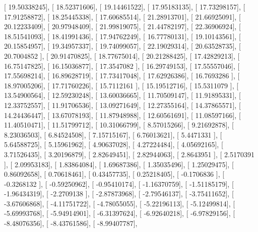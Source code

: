\documentclass{article}
\begin{document}
       [ 19.50338245],
       [ 18.52371606],
       [ 19.14461522],
       [ 17.95183135],
       [ 17.73298157],
       [ 17.91258872],
       [ 18.25445338],
       [ 17.60685514],
       [ 21.28913701],
       [ 21.66925091],
       [ 20.12233409],
       [ 20.97948409],
       [ 21.99819075],
       [ 21.44782197],
       [ 22.36906924],
       [ 18.51541093],
       [ 18.41991436],
       [ 17.94762249],
       [ 16.77780131],
       [ 19.10143561],
       [ 20.15854957],
       [ 19.34957337],
       [ 19.74099057],
       [ 22.19029314],
       [ 20.63528735],
       [ 20.7004852 ],
       [ 20.91470825],
       [ 18.77675014],
       [ 20.21288425],
       [ 17.42829213],
       [ 16.75147825],
       [ 16.15036877],
       [ 17.3547082 ],
       [ 16.29749153],
       [ 17.55557046],
       [ 17.55698214],
       [ 16.89628719],
       [ 17.73417048],
       [ 17.62926386],
       [ 16.7693286 ],
       [ 18.97005206],
       [ 17.71760226],
       [ 15.7112161 ],
       [ 15.19512716],
       [ 15.5311079 ],
       [ 13.54900564],
       [ 12.59230248],
       [ 13.60036665],
       [ 11.70509147],
       [ 11.91895331],
       [ 12.33752557],
       [ 11.91706536],
       [ 13.09271649],
       [ 12.27355164],
       [ 14.37865571],
       [ 14.24436447],
       [ 13.67078193],
       [ 11.87948988],
       [ 12.60561691],
       [ 11.08597166],
       [ 11.40510471],
       [ 11.51799712],
       [ 10.31066799],
       [  8.57015266],
       [  9.21692878],
       [  8.23036503],
       [  6.84524508],
       [  7.15715167],
       [  6.76013621],
       [  5.4471331 ],
       [  5.64588725],
       [  5.15961962],
       [  4.90637028],
       [  4.27224484],
       [  4.05692165],
       [  3.71526435],
       [  3.20196879],
       [  2.82649451],
       [  2.82944063],
       [  2.8643951 ],
       [  2.5170391 ],
       [  2.09953183],
       [  1.83864084],
       [  1.69687386],
       [  1.35035496],
       [  1.25029475],
       [  0.86092658],
       [  0.70618461],
       [  0.43457735],
       [  0.25218405],
       [ -0.1706836 ],
       [ -0.3268132 ],
       [ -0.59250962],
       [ -0.95410174],
       [ -1.16370759],
       [ -1.51185179],
       [ -1.96434319],
       [ -2.2709138 ],
       [ -2.87873968],
       [ -2.79546137],
       [ -3.75411652],
       [ -3.67606868],
       [ -4.11751722],
       [ -4.78055055],
       [ -5.22196113],
       [ -5.12499814],
       [ -5.69993768],
       [ -5.94914901],
       [ -6.31397624],
       [ -6.92640218],
       [ -6.97829156],
       [ -8.48076356],
       [ -8.43761586],
       [ -8.99407787],
\end{document}
